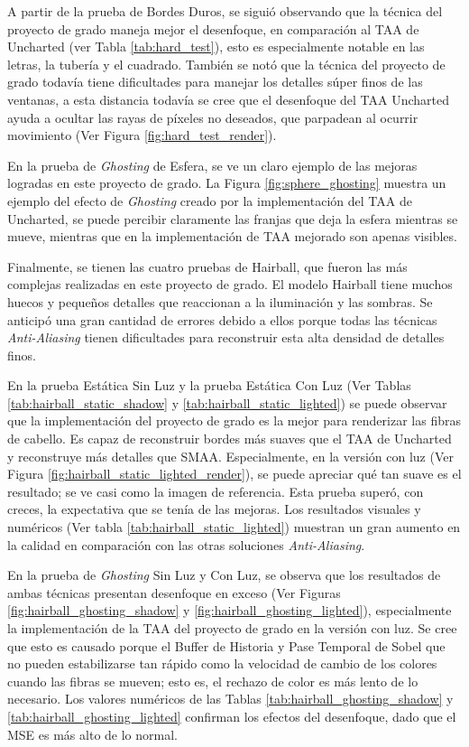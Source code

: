 \documentclass[pregrado]{tesis-usb} %
\begin{document}
A partir de la prueba de Bordes Duros, se siguió observando que la técnica del proyecto de grado maneja mejor el desenfoque, en comparación al TAA de Uncharted (ver Tabla \ref{tab:hard_test}), esto es especialmente notable en las letras, la tubería y el cuadrado. También se notó que la técnica del proyecto de grado todavía tiene dificultades para manejar los detalles súper finos de las ventanas, a esta distancia todavía se cree que el desenfoque del TAA Uncharted ayuda a ocultar las rayas de píxeles no deseados, que parpadean al ocurrir movimiento (Ver Figura \ref{fig:hard_test_render}).

En la prueba de \textit{Ghosting} de Esfera, se ve un claro ejemplo de las mejoras logradas en este proyecto de grado. La Figura \ref{fig:sphere_ghosting} muestra un ejemplo del efecto de \textit{Ghosting} creado por la implementación del TAA de Uncharted, se puede percibir claramente las franjas que deja la esfera mientras se mueve, mientras que en la implementación de TAA mejorado son apenas visibles.

Finalmente, se tienen las cuatro pruebas de Hairball, que fueron las más complejas realizadas en este proyecto de grado. El modelo Hairball tiene muchos huecos y pequeños detalles que reaccionan a la iluminación y las sombras. Se anticipó una gran cantidad de errores debido a ellos porque todas las técnicas \textit{Anti-Aliasing} tienen dificultades para reconstruir esta alta densidad de detalles finos.

En la prueba Estática Sin Luz y la prueba Estática Con Luz (Ver Tablas \ref{tab:hairball_static_shadow} y \ref{tab:hairball_static_lighted}) se puede observar que la implementación del proyecto de grado es la mejor para renderizar las fibras de cabello. Es capaz de reconstruir bordes más suaves que el TAA de Uncharted y reconstruye más detalles que SMAA. Especialmente, en la versión con luz (Ver Figura \ref{fig:hairball_static_lighted_render}), se puede apreciar qué tan suave es el resultado; se ve casi como la imagen de referencia. Esta prueba superó, con creces, la expectativa que se tenía de las mejoras. Los resultados visuales y numéricos (Ver tabla \ref{tab:hairball_static_lighted}) muestran un gran aumento en la calidad en comparación con las otras soluciones \textit{Anti-Aliasing}.

En la prueba de \textit{Ghosting} Sin Luz y Con Luz, se observa que los resultados de ambas técnicas presentan desenfoque en exceso (Ver Figuras \ref{fig:hairball_ghosting_shadow} y \ref{fig:hairball_ghosting_lighted}), especialmente la implementación de la TAA del proyecto de grado en la versión con luz. Se cree que esto es causado porque el Buffer de Historia y Pase Temporal de Sobel que no pueden estabilizarse tan rápido como la velocidad de cambio de los colores cuando las fibras se mueven; esto es, el rechazo de color es más lento de lo necesario. Los valores numéricos de las Tablas \ref{tab:hairball_ghosting_shadow} y \ref{tab:hairball_ghosting_lighted} confirman los efectos del desenfoque, dado que el MSE es más alto de lo normal.
\end{document}
